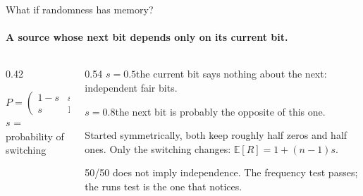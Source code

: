 \documentclass[11pt,aspectratio=169]{beamer}
\newcommand{\Ex}[1]{\mathbb{E}\!\left[#1\right]}
\begin{document}
\begin{frame}{What if randomness has memory?}
  \framesubtitle{A source whose next bit depends only on its current bit.}
  \begin{columns}[T]
    \begin{column}{0.42\textwidth}
      \begin{center}
      \end{center}
      \[P=\begin{pmatrix}1-s&s\\ s&1-s\end{pmatrix}\]
      {\small $s$ = probability of switching}
    \end{column}
    \begin{column}{0.54\textwidth}
      \textbf{\color{deep}$s=0.5$}\quad the current bit says nothing
      about the next: independent fair bits.

      \smallskip
      \textbf{\color{deep}$s=0.8$}\quad the next bit is probably the
      opposite of this one.

      \smallskip
      Started symmetrically, both keep roughly half zeros and half ones.
      Only the switching changes: $\Ex{R}=1+(n-1)s$.
      \begin{block}{}
        50/50 does not imply independence. The frequency test passes;
        the runs test is the one that notices.
      \end{block}
    \end{column}
  \end{columns}
\end{frame}
\end{document}
